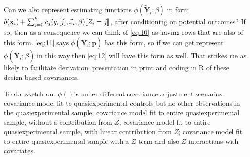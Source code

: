 \documentclass{article}
\DeclarePairedDelimiter{\indicator}{\llbracket}{\rrbracket}
\begin{document}
Can we also represent estimating functions
$\phi(\tilde{\mathbf{Y}}_{i}; \beta)$ in form
$b(\mathbf{x}_{i}) + \sum_{j=0}^{k}c_{j}(y_{i}[j], \vec{x}_{i}, \beta)\indicator{Z_{i}=j}$, after conditioning
on potential outcomes? If so, then as a consequence we can think of
\eqref{eq:10} as having rows that are also of this form.
\eqref{eq:11} says $\tilde{\phi}(\tilde{\mathbf{Y}}_{i}; \mathbf{p})$
has this form, so if we can get represent
$\phi(\tilde{\mathbf{Y}}_{i}; \beta)$ in this way then \eqref{eq:12}
will have this form as well. That strikes me as likely to facilitate
derivation, 
presentation in print and coding in R of these design-based covariances. 

To do:
sketch out $\phi()$'s under different covariance adjustment scenarios:
covariance model fit to quasiexperimental controls but no other
observations in the quasiexperimental sample; covariance model fit to
entire quasiexperimental sample, without a contribution from $Z$;
covariance model fit to entire quasiexperimental sample, with linear
contribution from $Z$; covariance model fit to entire
quasiexperimental sample with a $Z$ term and also $Z$-interactions
with covariates.
\end{document}
